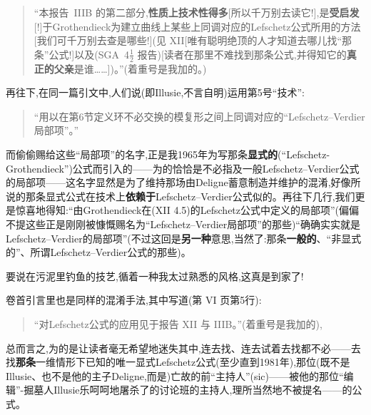 \begin{quote}
“本报告~IIIB 的第二部分,\textbf{性质上技术性得多}[所以千万别去读它!],是\textbf{受启发}[!]于Grothendieck为建立曲线上某些上同调对应的Lefschetz公式所用的方法[我们可千万别去查是哪些!](见 XII[唯有聪明绝顶的人才知道去哪儿找“那条”公式!]以及(SGA~4$\frac{1}{2}$ 报告)[读者在那里不难找到那条公式,并得知它的\textbf{真正的父亲}是谁……])。”(着重号是我加的。)
\end{quote}

再往下,在同一篇引文中,人们说(即Illusie,不言自明)运用第5号\dmark{}“技术”:

\begin{quote}
“用以在第6节定义环不必交换的模复形之间上同调对应的“Lefschetz--Verdier局部项”。”
\end{quote}

而偷偷赐给这些“局部项”的名字,正是我1965年为写那条\textbf{显式的}(“Lefschetz-Grothendieck”)公式而引入的——为的恰恰是不必指及一般Lefschetz--Verdier公式的局部项——这名字显然是为了维持那场由Deligne蓄意制造并维护的混淆,好像所说的那条显式公式在技术上\textbf{依赖于}Lefschetz--Verdier公式似的。再往下几行,我们更是惊喜地得知:“由Grothendieck在(XII 4.5)的Lefschetz公式中定义的局部项”(偏偏不提这些正是刚刚被慷慨赐名为“Lefschetz--Verdier局部项”的那些)“确确实实就是Lefschetz--Verdier的局部项”(不过这回是\textbf{另一种}意思,当然了:那条\textbf{一般的}、“非显式的”、所谓Lefschetz--Verdier公式的那些)。

要说在污泥里钓鱼的技艺,循着一种我太过熟悉的风格,这真是到家了!

卷首引言里也是同样的混淆手法,其中写道(第 VI 页第5行):

\begin{quote}
“对Lefschetz公式的应用见于报告 XII 与 IIIB。”(着重号是我加的),
\end{quote}

总而言之,为的是让读者毫无希望地迷失其中,连去找、连去试着去找都不必——去找\textbf{那条}一维情形下已知的唯一显式Lefschetz公式(至少直到1981年),那位(既不是Illusie、也不是他的主子Deligne,而是)亡故的前“主持人”(sic)——被他的那位“编辑”-掘墓人Illusie乐呵呵地屠杀了的讨论班的主持人,理所当然地不被提名——的公式。

